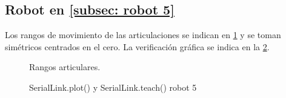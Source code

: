 \documentclass[a4paper,12pt]{article}
\begin{document}
\subsection{Robot en \cref{subsec: robot 5}}
Los rangos de movimiento de las articulaciones se indican en \cref{rangos fanuc}
y se toman simétricos centrados en el cero. La
verificación gráfica se indica en la \cref{teach robot 5}.

\begin{figure}[H]
    \centering
    \begin{adjustbox}{scale = 0.7, max width=\columnwidth}
    \end{adjustbox}
    \caption{Rangos articulares.}
    \label{rangos fanuc}
\end{figure}

\begin{figure}[H]
    \centering
    \begin{adjustbox}{max width=\columnwidth}
    \end{adjustbox}
    \caption{SerialLink.plot() y SerialLink.teach() robot 5}
    \label{teach robot 5}
\end{figure}
\end{document}
